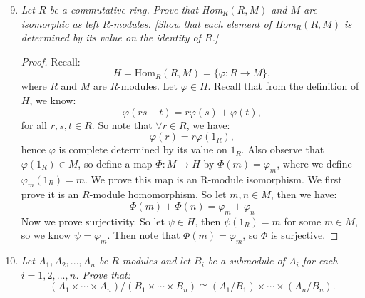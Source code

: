 \documentclass[9pt,reqno,twoside]{amsbook}
\theoremstyle{plain}
\numberwithin{section}{chapter}
\numberwithin{equation}{chapter}
\theoremstyle{definition}
\theoremstyle{remark}
\theoremstyle{plain}
\renewcommand{\phi}{\varphi}
\begin{document}
\begin{enumerate}[label=\arabic*.]
\setcounter{enumi}{8}
\item \textit{Let $R$ be a commutative ring. Prove that Hom$_R(R,M)$ and $M$ are isomorphic as left $R$-modules. [Show that each element of Hom$_R(R,M)$ is determined by its value on the identity of $R$.]}

\begin{proof}
Recall:
$$
H = \text{Hom}_R(R,M) = \{\phi:R \to M\},
$$
where $R$ and $M$ are $R$-modules. Let $\phi \in H$. Recall that from the definition of $H$, we know:
$$
\phi(rs + t) = r\phi(s) + \phi(t),
$$
for all $r,s,t \in R$. So note that $\forall r \in R$, we have:
$$
\phi(r) = r\phi(1_R),
$$
hence $\phi$ is complete determined by its value on $1_R$. Also observe that $\phi(1_R) \in M$, so define a map $\Phi:M \to H$ by $\Phi(m) = \phi_m$, where we define $\phi_m(1_R) = m$. We prove this map is an R-module isomorphism. We first prove it is an $R$-module homomorphism. So let $m,n \in M$, then we have:
$$
\Phi(m) + \Phi(n) = \phi_m + \phi_n
$$
Now we prove surjectivity. So let $\psi \in H$, then $\psi(1_R) = m$ for some $m \in M$, so we know $\psi = \phi_m$. Then note that $\Phi(m) = \phi_m$, so $\Phi$ is surjective. 
\end{proof}

\setcounter{enumi}{10}
\item \textit{Let $A_1,A_2,...,A_n$ be $R$-modules and let $B_i$ be a submodule of $A_i$ for each $i = 1,2,...,n$. Prove that: 
$$
(A_1 \times \cdots \times A_n)/(B_1 \times \cdots \times B_n) \cong (A_1/B_1) \times \cdots \times (A_n/B_n).
$$}


\end{enumerate}
\end{document}
